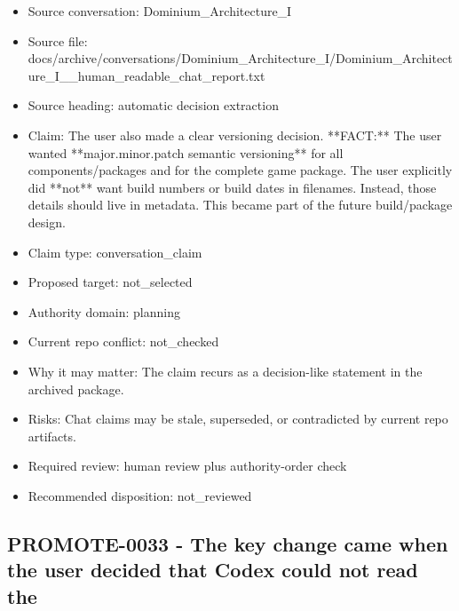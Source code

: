 \documentclass[11pt,a4paper]{report}
\begin{document}
\begin{itemize}
\item Source conversation: Dominium\_Architecture\_I
\item Source file: docs/archive/conversations/Dominium\_Architecture\_I/Dominium\_Architecture\_I\_\_human\_readable\_chat\_report.txt
\item Source heading: automatic decision extraction
\item Claim: The user also made a clear versioning decision. **FACT:** The user wanted **major.minor.patch semantic versioning** for all components/packages and for the complete game package. The user explicitly did **not** want build numbers or build dates in filenames. Instead, those details should live in metadata. This became part of the future build/package design.
\item Claim type: conversation\_claim
\item Proposed target: not\_selected
\item Authority domain: planning
\item Current repo conflict: not\_checked
\item Why it may matter: The claim recurs as a decision-like statement in the archived package.
\item Risks: Chat claims may be stale, superseded, or contradicted by current repo artifacts.
\item Required review: human review plus authority-order check
\item Recommended disposition: not\_reviewed
\end{itemize}

\subsection{PROMOTE-0033 - The key change came when the user decided that Codex could not read the}
\end{document}
